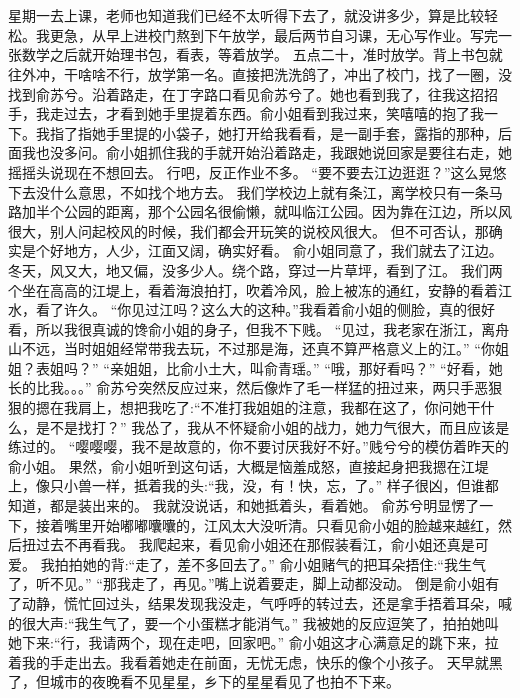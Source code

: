 \chapter{}
星期一去上课，老师也知道我们已经不太听得下去了，就没讲多少，算是比较轻松。我更急，从早上进校门熬到下午放学，最后两节自习课，无心写作业。写完一张数学之后就开始理书包，看表，等着放学。
五点二十，准时放学。背上书包就往外冲，干啥啥不行，放学第一名。直接把洗洗鸽了，冲出了校门，找了一圈，没找到俞苏兮。沿着路走，在丁字路口看见俞苏兮了。她也看到我了，往我这招招手，我走过去，才看到她手里提着东西。俞小姐看到我过来，笑嘻嘻的抱了我一下。我指了指她手里提的小袋子，她打开给我看看，是一副手套，露指的那种，后面我也没多问。俞小姐抓住我的手就开始沿着路走，我跟她说回家是要往右走，她摇摇头说现在不想回去。
行吧，反正作业不多。
“要不要去江边逛逛？”这么晃悠下去没什么意思，不如找个地方去。
我们学校边上就有条江，离学校只有一条马路加半个公园的距离，那个公园名很偷懒，就叫临江公园。因为靠在江边，所以风很大，别人问起校风的时候，我们都会开玩笑的说校风很大。
但不可否认，那确实是个好地方，人少，江面又阔，确实好看。
俞小姐同意了，我们就去了江边。冬天，风又大，地又偏，没多少人。绕个路，穿过一片草坪，看到了江。 我们两个坐在高高的江堤上，看着海浪拍打，吹着冷风，脸上被冻的通红，安静的看着江水，看了许久。
“你见过江吗？这么大的这种。”我看着俞小姐的侧脸，真的很好看，所以我很真诚的馋俞小姐的身子，但我不下贱。
“见过，我老家在浙江，离舟山不远，当时姐姐经常带我去玩，不过那是海，还真不算严格意义上的江。”
“你姐姐？表姐吗？”
“亲姐姐，比俞小土大，叫俞青瑶。”
“哦，那好看吗？”
“好看，她长的比我。。。”
俞苏兮突然反应过来，然后像炸了毛一样猛的扭过来，两只手恶狠狠的摁在我肩上，想把我吃了:“不准打我姐姐的注意，我都在这了，你问她干什么，是不是找打？”
我怂了，我从不怀疑俞小姐的战力，她力气很大，而且应该是练过的。 “嘤嘤嘤，我不是故意的，你不要讨厌我好不好。”贱兮兮的模仿着昨天的俞小姐。 果然，俞小姐听到这句话，大概是恼羞成怒，直接起身把我摁在江堤上，像只小兽一样，抵着我的头:“我，没，有！快，忘，了。”
样子很凶，但谁都知道，都是装出来的。
我就没说话，和她抵着头，看着她。
俞苏兮明显愣了一下，接着嘴里开始嘟嘟囔囔的，江风太大没听清。只看见俞小姐的脸越来越红，然后扭过去不再看我。
我爬起来，看见俞小姐还在那假装看江，俞小姐还真是可爱。
我拍拍她的背:“走了，差不多回去了。”
俞小姐赌气的把耳朵捂住:“我生气了，听不见。”
“那我走了，再见。”嘴上说着要走，脚上动都没动。
倒是俞小姐有了动静，慌忙回过头，结果发现我没走，气呼呼的转过去，还是拿手捂着耳朵，喊的很大声:“我生气了，要一个小蛋糕才能消气。”
我被她的反应逗笑了，拍拍她叫她下来:“行，我请两个，现在走吧，回家吧。”
俞小姐这才心满意足的跳下来，拉着我的手走出去。我看着她走在前面，无忧无虑，快乐的像个小孩子。
天早就黑了，但城市的夜晚看不见星星，乡下的星星看见了也拍不下来。
